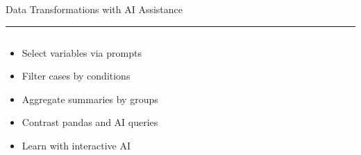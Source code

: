 \documentclass[aspectratio=169]{beamer}
\newcommand{\TitleFont}{\rmfamily}
\begin{document}
\begin{frame}[t]{}
  \vspace*{0.5cm}
  {\TitleFont\fontsize{18}{22}\selectfont\color{LUBronze}Data Transformations with AI Assistance\par}
  \vspace{0.3em}
  {\color{LUBronze}\rule{\linewidth}{0.8pt}}\par
  \vspace{0.2cm}
  \begin{columns}[t]
    \begin{column}[t]{0.4\textwidth}
      \vspace*{0pt}
      \begin{itemize}\setlength\itemsep{0.65em}
        \item Select variables via prompts
        \item Filter cases by conditions
        \item Aggregate summaries by groups
        \item Contrast pandas and AI queries
        \item Learn with interactive AI
      \end{itemize}
    \end{column}
  \end{columns}
\end{frame}
\end{document}
